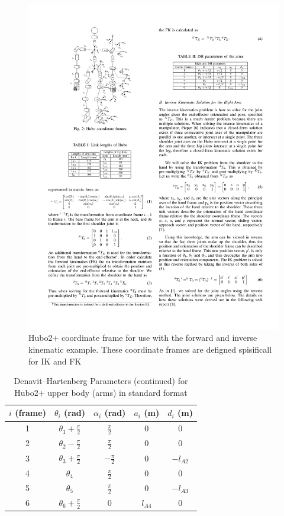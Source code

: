 \begin{figure}[thpb]
  \centering
\includegraphics[width=0.8\columnwidth]{./examples/pix/hubo2GTechFrame.pdf}
\caption{Hubo2+ coordinate frame for use with the forward and inverse kinematic example.  These coordinate frames are defigned spisificall for IK and FK     }
\label{fig:IkFkCoordinate}
\end{figure}


\begin{table}
\centering
\caption{Denavit–Hartenberg Parameters (continued) for Hubo2+ upper body (arms) in standard format}
\begin{tabular}{| c || c | c | c | c|}
\hline
$i$ (frame)  & $\theta_i$ (rad)         & $\alpha_i$ (rad) & $a_i$ (m) & $d_i$ (m) \\
\hline
\hline
1            & $\theta_1+\frac{\pi}{2}$ & $\frac{\pi}{2}$  & 0         & 0          \\
\hline
2            & $\theta_2-\frac{\pi}{2}$ & $\frac{\pi}{2}$  & 0         & 0          \\
\hline
3            & $\theta_3+\frac{\pi}{2}$ & $-\frac{\pi}{2}$ & 0         & $-l_{A2}$  \\
\hline
4            & $\theta_4$               & $\frac{\pi}{2}$  & 0         & 0          \\
\hline
5            & $\theta_5$               & $\frac{\pi}{2}$  & 0         & $-l_{A3}$  \\
\hline
6            & $\theta_6+\frac{\pi}{2}$ & 0                & $l_{A4}$  & 0          \\

\hline

\end{tabular}\label{table:dhparamrightArm}
\end{table}

